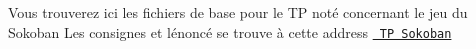 Vous trouverez ici les fichiers de base pour le TP noté concernant le jeu du Sokoban Les consignes et l\textquotesingle{}énoncé se trouve à cette address \href{https://techdevprintemps2022.pages.unistra.fr/TP_TechDevEnonce/}{\texttt{ TP Sokoban}} 